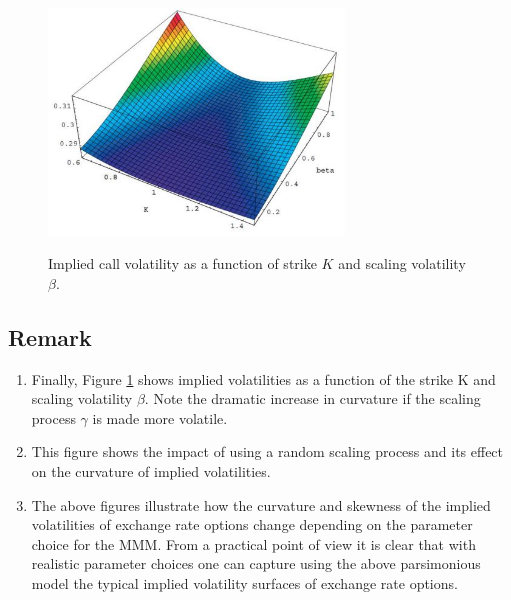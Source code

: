\documentclass[a4 paper, 12pt]{report}
\theoremstyle{plain}
\begin{document}
\newpage
\begin{figure}[hp]
	\centering
		\includegraphics[width=0.70\textwidth]{fig4.JPG}
	\label{image4}
	\caption{Implied call volatility as a function of strike $K$ and scaling volatility $\beta$.}
\end{figure}

\subsection*{Remark}
\begin{enumerate}
\item[(1.)] Finally, Figure \ref{image4} shows implied volatilities as a function of the strike K and
scaling volatility $\beta$. Note the dramatic increase in curvature if the scaling
process $\gamma$ is made more volatile.
\item[(2.)] This figure shows the impact of using a random scaling process and its
effect on the curvature of implied volatilities.
\item[(3.)] The above figures illustrate how the curvature and skewness of the
implied volatilities of exchange rate options change depending on the
parameter choice for the MMM. From a practical point of view it is clear
that with realistic parameter choices one can capture using the above
parsimonious model the typical implied volatility surfaces of exchange
rate options.
\end{enumerate}
\end{document}
